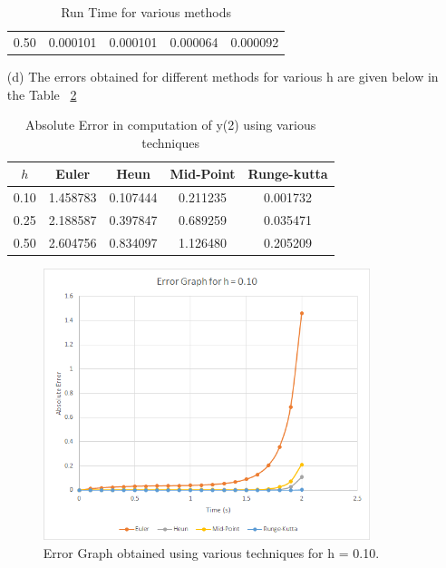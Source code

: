 \documentclass[titlepage, 11pt]{article}
\begin{document}
\begin{itemize}
\begin{table}[!tbh]
\begin{tabular}{c|cccc}
          0.50 & 0.000101 & 0.000101 & 0.000064 & 0.000092 \\
     \end{tabular}
     \caption{Run Time for various methods }
     \label{tab:mytable}
 \end{table}
 \item [(d)]The errors obtained for different methods for various h are given below in the Table ~\ref{tab:table4}
 \begin{table}[!htb]
    \caption{Absolute Error in computation of y(2) using various techniques}
    \centering
    \begin{tabular}{c|cccc}
    \toprule
    \textbf{$h$}&  \textbf{Euler}& \textbf{Heun}  & \textbf{Mid-Point} & \textbf{Runge-kutta} \\
    \midrule
         0.10 & 1.458783 & 0.107444 & 0.211235 & 0.001732 \\
         0.25 & 2.188587 & 0.397847	& 0.689259 & 0.035471 \\
         0.50 & 2.604756 & 0.834097& 1.126480 &	0.205209 \\
    \bottomrule
    \end{tabular}
    \label{tab:table4}
\end{table}
\begin{figure}[!tbh]
  	\centering
  	\includegraphics[width=0.9\textwidth]{EG0.1.png} 
  	\caption{Error Graph obtained using various techniques for h = 0.10.}
  	\label{fig:q112a} 
\end{figure}
\begin{figure}[!tbh]
  	\centering

\end{figure}
\end{itemize}
\end{document}

